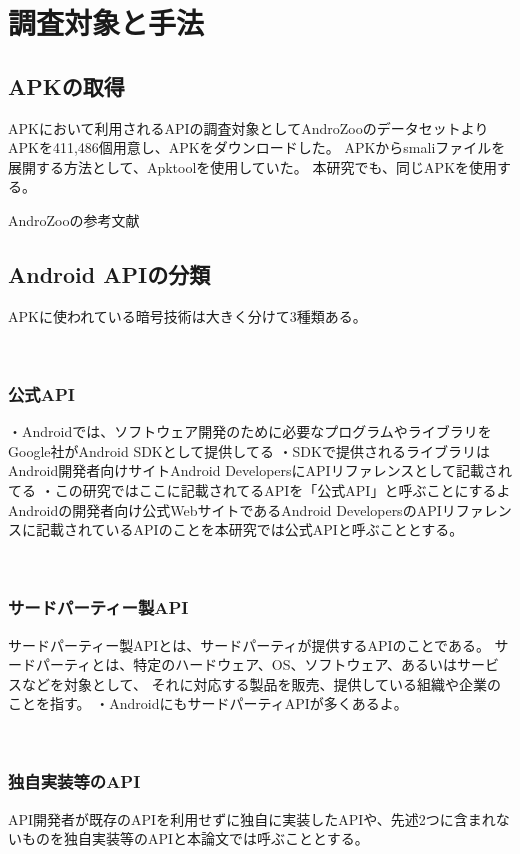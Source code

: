 \newpage

\section{調査対象と手法}
\subsection {APKの取得}

APKにおいて利用されるAPIの調査対象としてAndroZooのデータセットよりAPKを411,486個用意し、APKをダウンロードした。
APKからsmaliファイルを展開する方法として、Apktoolを使用していた。
本研究でも、同じAPKを使用する。


AndroZooの参考文献

\subsection{Android APIの分類}
APKに使われている暗号技術は大きく分けて3種類ある。

　\subsubsection {公式API}

・Androidでは、ソフトウェア開発のために必要なプログラムやライブラリをGoogle社がAndroid SDKとして提供してる
・SDKで提供されるライブラリはAndroid開発者向けサイトAndroid DevelopersにAPIリファレンスとして記載されてる
・この研究ではここに記載されてるAPIを「公式API」と呼ぶことにするよ
\fi
Androidの開発者向け公式WebサイトであるAndroid DevelopersのAPIリファレンスに記載されているAPIのことを本研究では公式APIと呼ぶこととする。

　\subsubsection {サードパーティー製API}
サードパーティー製APIとは、サードパーティが提供するAPIのことである。
サードパーティとは、特定のハードウェア、OS、ソフトウェア、あるいはサービスなどを対象として、
それに対応する製品を販売、提供している組織や企業のことを指す。
・AndroidにもサードパーティAPIが多くあるよ。

　\subsubsection {独自実装等のAPI}
API開発者が既存のAPIを利用せずに独自に実装したAPIや、先述2つに含まれないものを独自実装等のAPIと本論文では呼ぶこととする。

